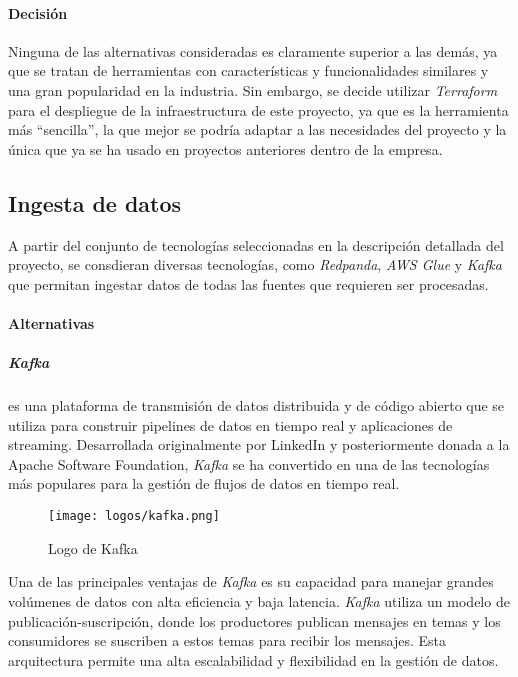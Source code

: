 \paragraph{Decisión}
Ninguna de las alternativas consideradas es claramente superior a las demás, ya
que se tratan de herramientas con características y funcionalidades similares y
una gran popularidad en la industria. Sin embargo, se decide utilizar
\textit{Terraform} para el despliegue de la infraestructura de este proyecto,
ya que es la herramienta más ``sencilla'', la que mejor se podría adaptar a las
necesidades del proyecto y la única que ya se ha usado en proyectos anteriores
dentro de la empresa.

\subsection{Ingesta de datos}\label{subsec:ingesta}
A partir del conjunto de tecnologías seleccionadas en la descripción detallada
del proyecto, se consdieran diversas tecnologías, como \textit{Redpanda},
\textit{AWS Glue} y \textit{Kafka} que permitan ingestar datos de todas las
fuentes que requieren ser procesadas.

\paragraph{Alternativas}
\subparagraph{Kafka} es una plataforma de transmisión de datos distribuida y de
código abierto que se utiliza para construir pipelines de datos en tiempo real y
aplicaciones de streaming. Desarrollada originalmente por LinkedIn y
posteriormente donada a la Apache Software Foundation, \textit{Kafka} se ha
convertido en una de las tecnologías más populares para la gestión de flujos de
datos en tiempo real.

\begin{figure}[H]
	\centering
	\texttt{[image: logos/kafka.png]}
	\caption{Logo de Kafka~\textregistered}
	\label{fig:kafka}
\end{figure}

Una de las principales ventajas de \textit{Kafka} es su capacidad para manejar
grandes volúmenes de datos con alta eficiencia y baja latencia. \textit{Kafka}
utiliza un modelo de publicación-suscripción, donde los productores publican
mensajes en temas y los consumidores se suscriben a estos temas para recibir
los mensajes. Esta arquitectura permite una alta escalabilidad y flexibilidad
en la gestión de datos.

